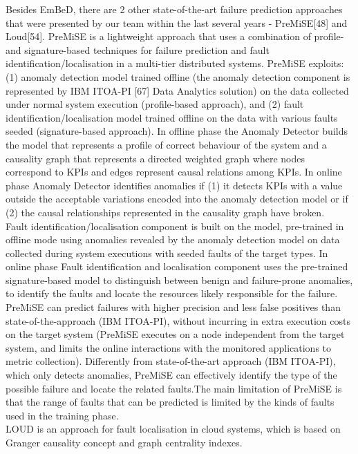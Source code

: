 \documentclass[]{usiinfprospectus}
\begin{document}
%
Besides EmBeD, there are 2 other state-of-the-art failure prediction approaches that were presented by our team within the last several years - PreMiSE[48] and Loud[54].
PreMiSE is a lightweight approach that uses a combination of profile- and signature-based techniques for failure prediction and fault identification/localisation in a multi-tier distributed systems.
%
PreMiSE exploits: (1) anomaly detection model trained offline (the anomaly detection component is represented by IBM ITOA-PI [67] Data Analytics solution) on the data collected under normal system execution (profile-based approach), and (2) fault identification/localisation model trained offline on the data with various faults seeded (signature-based approach). 
%
In offline phase the Anomaly Detector builds the model that represents a profile of correct behaviour of the system and a causality graph that represents a directed weighted graph where nodes correspond to KPIs and edges represent causal relations among KPIs. In online phase Anomaly Detector identifies anomalies if (1) it detects KPIs with a value outside the acceptable variations encoded into the anomaly detection model or if (2) the causal relationships represented in the causality graph have broken.\\
%
Fault identification/localisation component is built on the model, pre-trained in offline mode using anomalies revealed by the anomaly detection model on data collected during system executions with seeded faults of the target types. In online phase Fault identification and localisation component uses the pre-trained signature-based model to distinguish between benign and failure-prone anomalies, to identify the faults and locate the resources likely responsible for the failure.\\
%
PreMiSE can predict failures with higher precision and less false positives than state-of-the-approach (IBM ITOA-PI), without incurring in extra execution costs on the target system (PreMiSE executes on a node independent from the target system, and limits the online interactions with the monitored applications to metric collection). Differently from state-of-the-art approach (IBM ITOA-PI), which only detects anomalies, PreMiSE can effectively identify the type of the possible failure and locate the related faults.The main limitation of  PreMiSE is that the range of faults that can be predicted is limited by the kinds of faults used in the training phase.\\
LOUD is an approach for fault localisation in cloud systems, which is based on Granger causality concept and graph centrality indexes.\\
\end{document}
